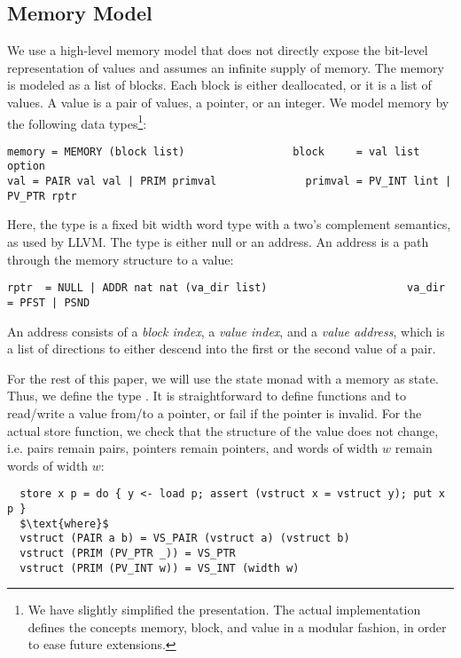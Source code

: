 \documentclass[a4paper,USenglish,cleveref, autoref]{lipics-v2019}
\begin{document}
\subsection{Memory Model}
We use a high-level memory model that does not directly expose the bit-level representation of values and assumes an infinite supply of memory. 
The memory is modeled as a list of blocks. Each block is either deallocated, or it is a list of values.
A value is a pair of values, a pointer, or an integer. We model memory by the following data types\footnote{We have slightly simplified the presentation. 
The actual implementation defines the concepts memory, block, and value in a modular fashion, in order to ease future extensions.
}:
\begin{lstlisting}
memory = MEMORY (block list)                 block     = val list option
val = PAIR val val | PRIM primval              primval = PV_INT lint | PV_PTR rptr
\end{lstlisting}
%
Here, the type  is a fixed bit width word type with a two's complement semantics, as used by LLVM. 
The type  is either null or an address. An address is a path through the memory structure to a value:
\begin{lstlisting}
rptr  = NULL | ADDR nat nat (va_dir list)                      va_dir = PFST | PSND
\end{lstlisting}
An address consists of a \emph{block index}, a \emph{value index}, and a \emph{value address}, which is a list of directions 
to either descend into the first or the second value of a pair.

For the rest of this paper, we will use the state monad with a memory as state. Thus, we define the type .
It is straightforward to define functions  and  to read/write a value from/to a pointer, 
or fail if the pointer is invalid.
For the actual store function, we check that the structure of the value does not change, i.e. pairs remain pairs, pointers remain pointers, and words of width $w$ remain words of width $w$:
\begin{lstlisting}
  store x p = do { y <- load p; assert (vstruct x = vstruct y); put x p }
  $\text{where}$
  vstruct (PAIR a b) = VS_PAIR (vstruct a) (vstruct b)
  vstruct (PRIM (PV_PTR _)) = VS_PTR
  vstruct (PRIM (PV_INT w)) = VS_INT (width w) 
\end{lstlisting}
\end{document}
